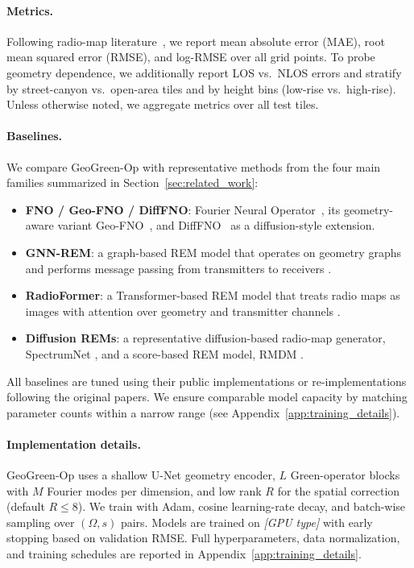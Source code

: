 \documentclass{article}
\begin{document}
\paragraph{Metrics.}
Following radio-map literature~\cite{romero2022radiomap,feng2025survey},
we report mean absolute error (MAE), root mean squared error (RMSE),
and log-RMSE over all grid points.
To probe geometry dependence, we additionally report LOS vs.\ NLOS
errors and stratify by street-canyon vs.\ open-area tiles and by
height bins (low-rise vs.\ high-rise).
Unless otherwise noted, we aggregate metrics over all test tiles.

\paragraph{Baselines.}
We compare GeoGreen-Op with representative methods from the four main
families summarized in Section~\ref{sec:related_work}:

\begin{itemize}[leftmargin=1.5em, itemsep=0.1em]
\item \textbf{FNO / Geo-FNO / DiffFNO}:
Fourier Neural Operator~\cite{li2020fourier},
its geometry-aware variant Geo-FNO~\cite{gao2021geofno,li2025fnoMIMO},
and DiffFNO~\cite{Liu_2025_CVPR} as a diffusion-style extension.

\item \textbf{GNN-REM}:
a graph-based REM model that operates on geometry graphs
and performs message passing from transmitters to receivers
\cite{chen2023gnnrem}.

\item \textbf{RadioFormer}:
a Transformer-based REM model that treats radio maps as images
with attention over geometry and transmitter channels
\cite{fang2025radioformer}.

\item \textbf{Diffusion REMs}:
a representative diffusion-based radio-map generator, SpectrumNet
\cite{zhang2024spectrumnet}, and a score-based REM model, RMDM
\cite{jia2025rmdm}.
\end{itemize}

All baselines are tuned using their public implementations or
re-implementations following the original papers.
We ensure comparable model capacity by matching parameter counts
within a narrow range (see Appendix~\ref{app:training_details}).

\paragraph{Implementation details.}
GeoGreen-Op uses a shallow U-Net geometry encoder,
$L$ Green-operator blocks with $M$ Fourier modes per dimension,
and low rank $R$ for the spatial correction (default $R\le 8$).
We train with Adam, cosine learning-rate decay, and batch-wise
sampling over $(\Omega, s)$ pairs.
Models are trained on \emph{[GPU type]} with early stopping based on
validation RMSE.
Full hyperparameters, data normalization, and training schedules are
reported in Appendix~\ref{app:training_details}.
\end{document}
